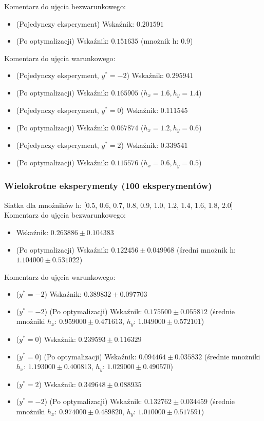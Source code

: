 \documentclass[12pt,a4paper,oneside]{book}
\theoremstyle{definition}
\begin{document}
\newpage
\noindent Komentarz do ujęcia bezwarunkowego:
\begin{itemize}
\item (Pojedynczy eksperyment) Wskaźnik: $0.201591$
\item (Po optymalizacji) Wskaźnik: $0.151635$ (mnożnik h: $0.9$)
\end{itemize}
Komentarz do ujęcia warunkowego:
\begin{itemize}
\item (Pojedynczy eksperyment, $y^*=-2$) Wskaźnik: $0.295941$
\item (Po optymalizacji) Wskaźnik: $0.165905$ ($h_x=1.6, h_y=1.4$)
\item (Pojedynczy eksperyment, $y^*=0$) Wskaźnik: $0.111545$
\item (Po optymalizacji) Wskaźnik: $0.067874$ ($h_x=1.2, h_y=0.6$)
\item (Pojedynczy eksperyment, $y^*=2$) Wskaźnik: $0.339541$
\item (Po optymalizacji) Wskaźnik: $0.115576$ ($h_x=0.6, h_y=0.5$)
\end{itemize}

\subsubsection*{Wielokrotne eksperymenty (100 eksperymentów)}

Siatka dla mnożników h: [0.5, 0.6, 0.7, 0.8, 0.9, 1.0, 1.2, 1.4, 1.6, 1.8, 2.0] \\

\noindent Komentarz do ujęcia bezwarunkowego:
\begin{itemize}
\item Wskaźnik: $0.263886 \pm 0.104383$
\item (Po optymalizacji) Wskaźnik: $0.122456 \pm 0.049968$ (średni mnożnik h: $1.104000 \pm 0.531022$)
\end{itemize}
Komentarz do ujęcia warunkowego:
\begin{itemize}
\item ($y^*=-2$) Wskaźnik: $0.389832 \pm 0.097703$
\item ($y^*=-2$) (Po optymalizacji) Wskaźnik: $0.175500 \pm 0.055812$ (średnie mnożniki $h_x$: $0.959000 \pm 0.471613$, $h_y$: $1.049000 \pm 0.572101$)
\item ($y^*=0$) Wskaźnik: $0.239593 \pm 0.116329$
\item ($y^*=0$) (Po optymalizacji) Wskaźnik: $0.094464 \pm 0.035832$ (średnie mnożniki $h_x$: $1.193000 \pm 0.400813$, $h_y$: $1.029000 \pm 0.490570$)
\item ($y^*=2$) Wskaźnik: $0.349648 \pm 0.088935$
\item ($y^*=-2$) (Po optymalizacji) Wskaźnik: $0.132762 \pm 0.034459$ (średnie mnożniki $h_x$: $0.974000 \pm 0.489820$, $h_y$: $1.010000 \pm 0.517591$)
\end{itemize}
\end{document}
